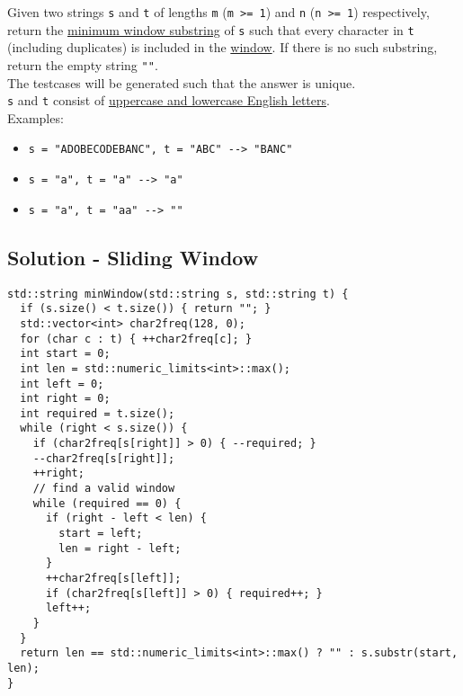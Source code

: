 {Given two strings {\colorbox{CodeBackground}{\lstinline|s|}} and {\colorbox{CodeBackground}{\lstinline|t|}} of lengths {\colorbox{CodeBackground}{\lstinline|m|}} ({\colorbox{CodeBackground}{\lstinline|m >= 1|}}) and {\colorbox{CodeBackground}{\lstinline|n|}} ({\colorbox{CodeBackground}{\lstinline|n >= 1|}}) respectively, return the \ul{minimum window 
substring} of {\colorbox{CodeBackground}{\lstinline|s|}} such that every character in {\colorbox{CodeBackground}{\lstinline|t|}} (including duplicates) is included in the \ul{window}. If there is no such substring, return the empty string {\colorbox{CodeBackground}{\lstinline|""|}}.\\

The testcases will be generated such that the answer is unique.\\

{\colorbox{CodeBackground}{\lstinline|s|}} and {\colorbox{CodeBackground}{\lstinline|t|}} consist of \ul{uppercase and lowercase English letters}.\\

Examples:
\begin{itemize}
\item {\colorbox{CodeBackground}{\lstinline|s = "ADOBECODEBANC", t = "ABC" --> "BANC"|}}
\item {\colorbox{CodeBackground}{\lstinline|s = "a", t = "a" --> "a"|}}
\item {\colorbox{CodeBackground}{\lstinline|s = "a", t = "aa" --> ""|}}
\end{itemize}

\subsection*{Solution - Sliding Window}
\begin{lstlisting}
std::string minWindow(std::string s, std::string t) {
  if (s.size() < t.size()) { return ""; }
  std::vector<int> char2freq(128, 0);
  for (char c : t) { ++char2freq[c]; }
  int start = 0;
  int len = std::numeric_limits<int>::max();
  int left = 0;
  int right = 0;
  int required = t.size();
  while (right < s.size()) {
    if (char2freq[s[right]] > 0) { --required; }
    --char2freq[s[right]];
    ++right;
    // find a valid window
    while (required == 0) {
      if (right - left < len) {
        start = left;
        len = right - left;
      }
      ++char2freq[s[left]];
      if (char2freq[s[left]] > 0) { required++; }
      left++;
    }
  }
  return len == std::numeric_limits<int>::max() ? "" : s.substr(start, len);
}
\end{lstlisting}

}
